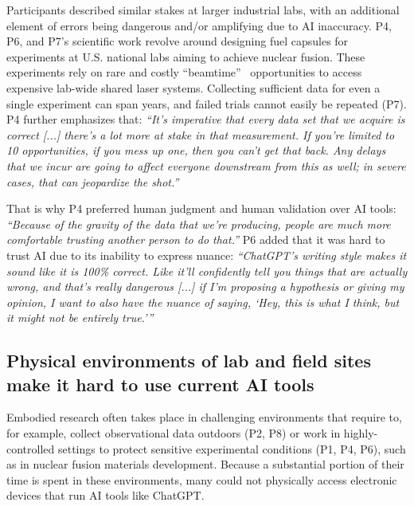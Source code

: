Participants described similar stakes at larger industrial labs, with an additional element of errors being dangerous and/or amplifying due to AI inaccuracy. P4, P6, and P7's scientific work revolve around designing fuel capsules for experiments at U.S. national labs aiming to achieve nuclear fusion. These experiments rely on rare and costly ``beamtime''~\cite{traweek2009beamtimes} opportunities to  access expensive lab-wide shared laser systems. Collecting sufficient data for even a single experiment can span years, and failed trials cannot easily be repeated (P7). P4 further emphasizes that: \textit{``It's imperative that every data set that we acquire is correct [...] there's a lot more at stake in that measurement. If you're limited to 10 opportunities, if you mess up one, then you can't get that back. Any delays that we incur are going to affect everyone downstream from this as well; in severe cases, that can jeopardize the shot.''}

That is why P4 preferred human judgment and human validation over AI tools: \textit{``Because of the gravity of the data that we're producing, people are much more comfortable trusting another person to do that.''} P6 added that it was hard to trust AI due to its inability to express nuance: \textit{``ChatGPT's writing style makes it sound like it is 100\% correct. Like it'll confidently tell you things that are actually wrong, and that's really dangerous [...] if I'm proposing a hypothesis or giving my opinion, I want to also have the nuance of saying, `Hey, this is what I think, but it might not be entirely true.'''}


\subsection{Physical environments of lab and field sites make it hard to use current AI tools}

Embodied research often takes place in challenging environments that require  to, for example, collect observational data outdoors (P2, P8) or work in highly-controlled settings to protect sensitive experimental conditions (P1, P4, P6), such as in nuclear fusion materials development. Because a substantial portion of their time is spent in these environments, many  could not physically access electronic devices that run AI tools like ChatGPT. 

